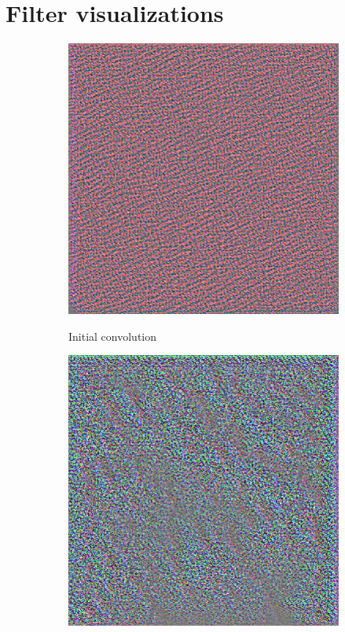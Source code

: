 \documentclass{kththesis}
\begin{document}
\section{Filter visualizations}
\begin{figure}
  \begin{subfigure}{.5\textwidth}
    \centering
    \includegraphics[width=0.9\linewidth]{img/layer0.png}
    \label{fig:layer0}
    \caption{Initial convolution}
  \end{subfigure}%
  \begin{subfigure}{.5\textwidth}
    \centering
    \includegraphics[width=0.9\linewidth]{img/layer1.png}

\end{subfigure}
\end{figure}
\end{document}
